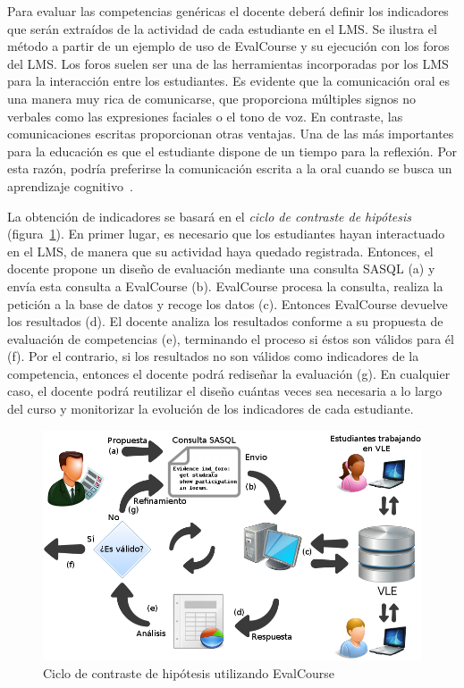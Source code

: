 			Para evaluar las competencias genéricas el docente deberá definir los indicadores que serán extraídos de la actividad de cada estudiante en el LMS. Se ilustra el método a partir de un ejemplo de uso de EvalCourse y su ejecución con los foros del LMS. Los foros suelen ser una de las herramientas incorporadas por los LMS para la interacción entre los estudiantes. Es evidente que la comunicación oral es una manera muy rica de comunicarse, que proporciona múltiples signos no verbales como las expresiones faciales o el tono de voz. En contraste, las comunicaciones escritas proporcionan otras ventajas. Una de las más importantes para la educación es que el estudiante dispone de un tiempo para la reflexión. Por esta razón, podría preferirse la comunicación escrita a la oral cuando se busca un aprendizaje cognitivo~\cite{garrison1999critical}.

			La obtención de indicadores se basará en el \emph{ciclo de contraste de hipótesis} (figura~\ref{fig:EVCDiagram}). En primer lugar, es necesario que los estudiantes hayan interactuado en el LMS, de manera que su actividad haya quedado registrada. Entonces, el docente propone un diseño de evaluación mediante una consulta SASQL (a) y envía esta consulta a EvalCourse (b). EvalCourse procesa la consulta, realiza la petición a la base de datos y recoge los datos (c). Entonces EvalCourse devuelve los resultados (d). El docente analiza los resultados conforme a su propuesta de evaluación de competencias (e), terminando el proceso si éstos son válidos para él (f). Por el contrario, si los resultados no son válidos como indicadores de la competencia, entonces el docente podrá rediseñar la evaluación (g). En cualquier caso, el docente podrá reutilizar el diseño cuántas veces sea necesaria a lo largo del curso y monitorizar la evolución de los indicadores de cada estudiante.

\begin{figure}
  \begin{center}
    \includegraphics[scale=0.45]{EvcDiagram.png}
  \end{center}
  \caption{Ciclo de contraste de hipótesis utilizando EvalCourse}
  \label{fig:EVCDiagram}
\end{figure}

